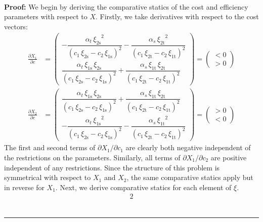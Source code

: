 \documentclass[11pt,a4paper]{extarticle}
\newenvironment{proof}[1][Proof]{\noindent\textbf{#1:} }{\ \rule{0.5em}{0.5em}}
\begin{document}
\hfill \\
\begin{proof}
	We begin by deriving the comparative statics of the cost and efficiency parameters with respect to $X$.   Firstly, we take derivatives with respect to the cost vectors:
	\begin{align*}
	\frac{\partial X_1}{\partial c} &= 
	\begin{pmatrix}
	-\dfrac{\alpha _{t}\,{\xi _{\mathrm{2s}}}^2}{{\left(c_{1}\,\xi _{\mathrm{2s}}-c_{2}\,\xi _{\mathrm{1s}}\right)}^2}-\dfrac{\alpha _{s}\,{\xi _{\mathrm{2t}}}^2}{{\left(c_{1}\,\xi _{\mathrm{2t}}-c_{2}\,\xi _{\mathrm{1t}}\right)}^2} \\
	\dfrac{\alpha _{t}\,\xi _{\mathrm{1s}}\,\xi _{\mathrm{2s}}}{{\left(c_{1}\,\xi _{\mathrm{2s}}-c_{2}\,\xi _{\mathrm{1s}}\right)}^2}+\dfrac{\alpha _{s}\,\xi _{\mathrm{1t}}\,\xi _{\mathrm{2t}}}{{\left(c_{1}\,\xi _{\mathrm{2t}}-c_{2}\,\xi _{\mathrm{1t}}\right)}^2}
	\end{pmatrix}
	=
	\begin{pmatrix}
	< 0 \\
	> 0 
	\end{pmatrix} \\
	\frac{\partial X_2}{\partial c} &= 
	\begin{pmatrix}
	\dfrac{\alpha _{t}\,\xi _{\mathrm{1s}}\,\xi _{\mathrm{2s}}}{{\left(c_{1}\,\xi _{\mathrm{2s}}-c_{2}\,\xi _{\mathrm{1s}}\right)}^2}+\dfrac{\alpha _{s}\,\xi _{\mathrm{1t}}\,\xi _{\mathrm{2t}}}{{\left(c_{1}\,\xi _{\mathrm{2t}}-c_{2}\,\xi _{\mathrm{1t}}\right)}^2} \\
	-\dfrac{\alpha _{t}\,{\xi _{\mathrm{1s}}}^2}{{\left(c_{1}\,\xi _{\mathrm{2s}}-c_{2}\,\xi _{\mathrm{1s}}\right)}^2}-\dfrac{\alpha _{s}\,{\xi _{\mathrm{1t}}}^2}{{\left(c_{1}\,\xi _{\mathrm{2t}}-c_{2}\,\xi _{\mathrm{1t}}\right)}^2}
	\end{pmatrix}
	=
	\begin{pmatrix}
	> 0 \\
	< 0 
	\end{pmatrix}
	\end{align*}
	The first and second terms of $\partial X_1 / \partial c_1$ are clearly both negative independent of the restrictions on the parameters. Similarly, all terms of  $\partial X_1 / \partial c_2$ are positive independent of any restrictions. Since the structure of this problem is symmetrical with respect to $X_1$ and $X_2$, the same comparative statics apply but in reverse for $X_1$. Next, we derive comparative statics for each element of $\xi$.
	\begin{alignat*}{2}

\end{alignat*}
\end{proof}
\end{document}
